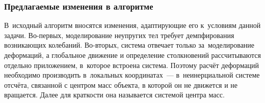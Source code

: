 \documentclass[a4paper, 14pt, titlepage]{extarticle}
\begin{document}
      \subsubsection{Предлагаемые изменения в алгоритме}\label{sssec:proposed_changes}

        В~исходный алгоритм вносятся изменения, адаптирующие его к~условиям данной
        задачи. Во-первых, моделирование неупругих тел требует демпфирования возникающих колебаний.
        Во-вторых, система отвечает только за~моделирование деформаций, а глобальное движение и
        определение столкновений рассчитываются отдельно приложением, в~которое встроена система.
        Поэтому расчёт деформаций необходимо производить в~локальных координатах~---
        в~неинерциальной системе отсчёта, связанной с центром масс объекта, в которой он не
        движется и не вращается. Далее для краткости она называется системой центра масс.
\end{document}
